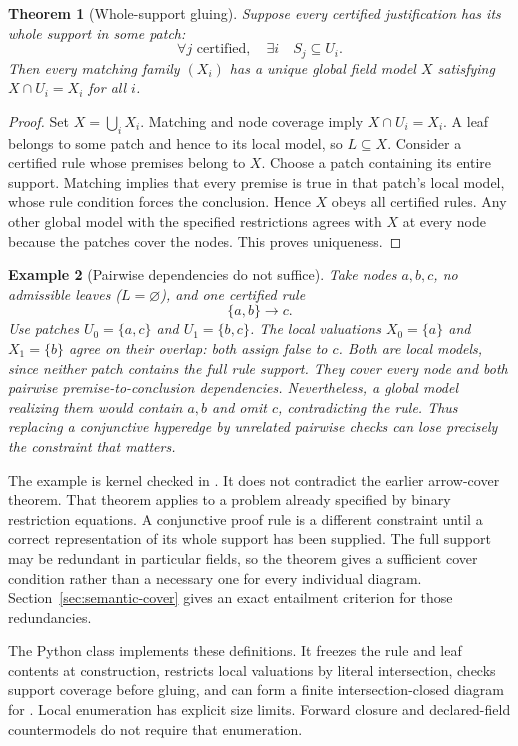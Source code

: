 \documentclass[11pt,oneside]{article}
\theoremstyle{komorebiplain}
\newtheorem{theorem}{Theorem}[section]
\theoremstyle{komorebidefinition}
\newtheorem{example}[theorem]{Example}
\theoremstyle{komorebiremark}
\begin{document}
\begin{theorem}[Whole-support gluing]
\label{res:24:3}
\label{thm:support-gluing}
Suppose every certified justification has its whole support in some patch:
\[
\forall j\text{ certified},\quad\exists i\quad S_j\subseteq U_i.
\]
Then every matching family $(X_i)$ has a unique global field model $X$ satisfying $X\cap U_i=X_i$ for all $i$.
\end{theorem}
\begin{proof}
Set $X=\bigcup_iX_i$. Matching and node coverage imply $X\cap U_i=X_i$. A leaf belongs to some patch and hence to its local model, so $L\subseteq X$. Consider a certified rule whose premises belong to $X$. Choose a patch containing its entire support. Matching implies that every premise is true in that patch's local model, whose rule condition forces the conclusion. Hence $X$ obeys all certified rules. Any other global model with the specified restrictions agrees with $X$ at every node because the patches cover the nodes. This proves uniqueness.
\end{proof}

\begin{example}[Pairwise dependencies do not suffice]
\label{res:24:4}
Take nodes $a,b,c$, no admissible leaves ($L=\varnothing$), and one certified rule
\[
\{a,b\}\longrightarrow c.
\]
Use patches $U_0=\{a,c\}$ and $U_1=\{b,c\}$. The local valuations $X_0=\{a\}$ and $X_1=\{b\}$ agree on their overlap: both assign false to $c$. Both are local models, since neither patch contains the full rule support. They cover every node and both pairwise premise-to-conclusion dependencies. Nevertheless, a global model realizing them would contain $a,b$ and omit $c$, contradicting the rule. Thus replacing a conjunctive hyperedge by unrelated pairwise checks can lose precisely the constraint that matters.
\end{example}

The example is kernel checked in . It does not contradict the earlier arrow-cover theorem. That theorem applies to a problem already specified by binary restriction equations. A conjunctive proof rule is a different constraint until a correct representation of its whole support has been supplied. The full support may be redundant in particular fields, so the theorem gives a sufficient cover condition rather than a necessary one for every individual diagram. Section~\ref{sec:semantic-cover} gives an exact entailment criterion for those redundancies.

The Python class  implements these definitions. It freezes the rule and leaf contents at construction, restricts local valuations by literal intersection, checks support coverage before gluing, and can form a finite intersection-closed diagram for . Local enumeration has explicit size limits. Forward closure and declared-field countermodels do not require that enumeration.
\end{document}
